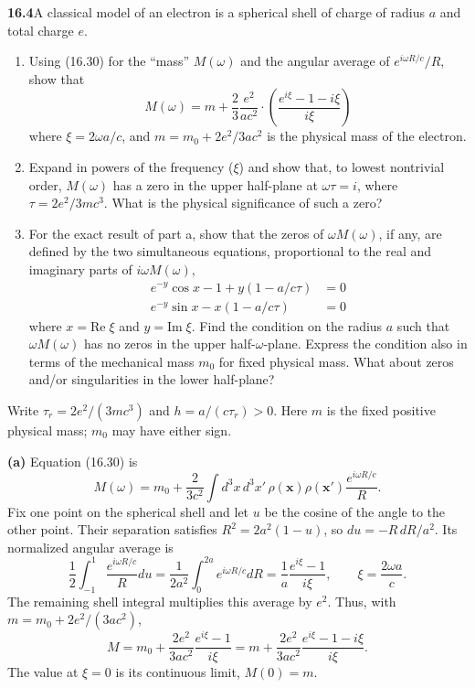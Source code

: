 \par\bigskip
\noindent\textbf{16.4}\quad A classical model of an electron is a spherical shell of charge of radius $a$ and total charge $e$.
\begin{enumerate}
\item[(a)] Using (16.30) for the ``mass'' $M(\omega)$ and the angular average of $e^{i\omega R/c}/R$, show that
\[
M(\omega)=m+\frac{2}{3}\frac{e^{2}}{ac^{2}}\cdot\left(\frac{e^{i\xi}-1-i\xi}{i\xi}\right)
\]
where $\xi=2\omega a/c$, and $m=m_{0}+2e^{2}/3ac^{2}$ is the physical mass of the electron.
\item[(b)] Expand in powers of the frequency ($\xi$) and show that, to lowest nontrivial order, $M(\omega)$ has a zero in the upper half-plane at $\omega\tau=i$, where $\tau=2e^{2}/3mc^{3}$. What is the physical significance of such a zero?
\item[(c)] For the exact result of part a, show that the zeros of $\omega M(\omega)$, if any, are defined by the two simultaneous equations, proportional to the real and imaginary parts of $i\omega M(\omega)$,
\begin{align*}
e^{-y}\cos x-1+y(1-a/c\tau)&=0\\
e^{-y}\sin x-x(1-a/c\tau)&=0
\end{align*}
where $x=\mathrm{Re}\;\xi$ and $y=\mathrm{Im}\;\xi$. Find the condition on the radius $a$ such that $\omega M(\omega)$ has no zeros in the upper half-$\omega$-plane. Express the condition also in terms of the mechanical mass $m_{0}$ for fixed physical mass. What about zeros and/or singularities in the lower half-plane?
\end{enumerate}
\solution

Write $\tau_r=2e^2/(3mc^3)$ and $h=a/(c\tau_r)>0$.
Here $m$ is the fixed positive physical mass; $m_0$ may have either sign.

\textbf{(a)} Equation (16.30) is
\[
M(\omega)=m_0+\frac{2}{3c^2}\int d^3x\,d^3x'\,
\rho(\mathbf x)\rho(\mathbf x')\frac{e^{i\omega R/c}}R.
\]
Fix one point on the spherical shell and let $u$ be the cosine of the
angle to the other point. Their separation satisfies
$R^2=2a^2(1-u)$, so $du=-R\,dR/a^2$. Its normalized angular average is
\[
\frac12\int_{-1}^1\frac{e^{i\omega R/c}}Rdu
=\frac1{2a^2}\int_0^{2a}e^{i\omega R/c}dR
=\frac1a\frac{e^{i\xi}-1}{i\xi},\qquad \xi=\frac{2\omega a}c.
\]
The remaining shell integral multiplies this average by $e^2$.
Thus, with $m=m_0+2e^2/(3ac^2)$,
\[
\boxed{M=m_0+\frac{2e^2}{3ac^2}\frac{e^{i\xi}-1}{i\xi}
=m+\frac{2e^2}{3ac^2}\frac{e^{i\xi}-1-i\xi}{i\xi}.}
\]
The value at $\xi=0$ is its continuous limit, $M(0)=m$.

